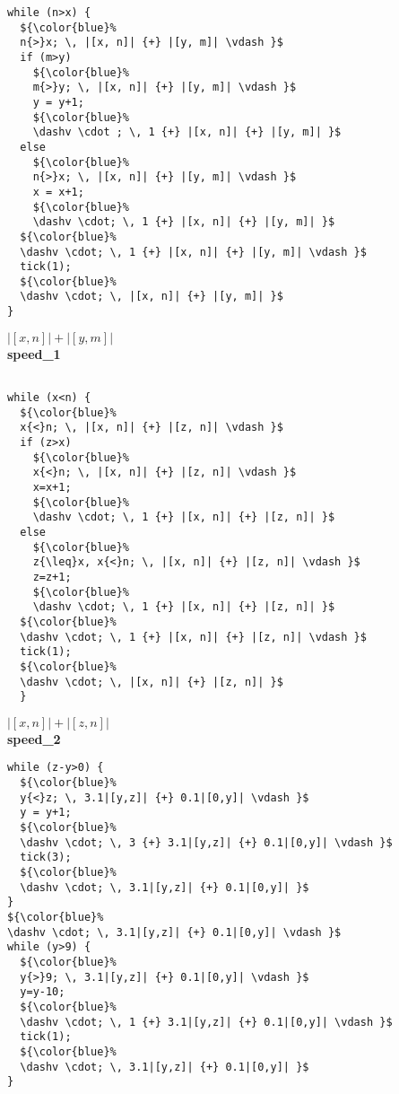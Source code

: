 \documentclass[nocopyrightspace,preprint]{sigplanconf}
\begin{document}
\begin{figure*}[t!]
 \setlength{\progwidth}{.22\linewidth}
  \centering
\hspace{-0.4cm}
  \begin{minipage}[b]{.18\linewidth}
    \begin{center}
   \begin{lstlisting}[]
while (n>x) {
  ${\color{blue}%
  n{>}x; \, |[x, n]| {+} |[y, m]| \vdash }$
  if (m>y) 
    ${\color{blue}%
    m{>}y; \, |[x, n]| {+} |[y, m]| \vdash }$
    y = y+1;
    ${\color{blue}%
    \dashv \cdot ; \, 1 {+} |[x, n]| {+} |[y, m]| }$
  else
    ${\color{blue}%
    n{>}x; \, |[x, n]| {+} |[y, m]| \vdash }$
    x = x+1;
    ${\color{blue}%
    \dashv \cdot; \, 1 {+} |[x, n]| {+} |[y, m]| }$
  ${\color{blue}%
  \dashv \cdot; \, 1 {+} |[x, n]| {+} |[y, m]| \vdash }$
  tick(1);
  ${\color{blue}%
  \dashv \cdot; \, |[x, n]| {+} |[y, m]| }$
}
   \end{lstlisting}

$|[x, n]| + |[y, m]|$
\\[.7\baselineskip]
      {\bf speed\_1}
    \end{center}
  \end{minipage}
%
\hfill
%
  \begin{minipage}[b]{\progwidth}
    \begin{center}
   \begin{lstlisting}

while (x<n) {
  ${\color{blue}%
  x{<}n; \, |[x, n]| {+} |[z, n]| \vdash }$
  if (z>x)
    ${\color{blue}%
    x{<}n; \, |[x, n]| {+} |[z, n]| \vdash }$
    x=x+1;
    ${\color{blue}%
    \dashv \cdot; \, 1 {+} |[x, n]| {+} |[z, n]| }$
  else
    ${\color{blue}%
    z{\leq}x, x{<}n; \, |[x, n]| {+} |[z, n]| \vdash }$
    z=z+1;
    ${\color{blue}%
    \dashv \cdot; \, 1 {+} |[x, n]| {+} |[z, n]| }$
  ${\color{blue}%
  \dashv \cdot; \, 1 {+} |[x, n]| {+} |[z, n]| \vdash }$
  tick(1);
  ${\color{blue}%
  \dashv \cdot; \, |[x, n]| {+} |[z, n]| }$
  }
   \end{lstlisting}

$|[x, n]| + |[z, n]|$
\\[.7\baselineskip]
      {\bf speed\_2}
    \end{center}
  \end{minipage}
%
\hfill
%
  \begin{minipage}[b]{\progwidth}
    \begin{center}
   \begin{lstlisting}
while (z-y>0) {
  ${\color{blue}%
  y{<}z; \, 3.1|[y,z]| {+} 0.1|[0,y]| \vdash }$
  y = y+1;
  ${\color{blue}%
  \dashv \cdot; \, 3 {+} 3.1|[y,z]| {+} 0.1|[0,y]| \vdash }$
  tick(3);
  ${\color{blue}%
  \dashv \cdot; \, 3.1|[y,z]| {+} 0.1|[0,y]| }$
}
${\color{blue}%
\dashv \cdot; \, 3.1|[y,z]| {+} 0.1|[0,y]| \vdash }$
while (y>9) {
  ${\color{blue}%
  y{>}9; \, 3.1|[y,z]| {+} 0.1|[0,y]| \vdash }$
  y=y-10;
  ${\color{blue}%
  \dashv \cdot; \, 1 {+} 3.1|[y,z]| {+} 0.1|[0,y]| \vdash }$
  tick(1);
  ${\color{blue}%
  \dashv \cdot; \, 3.1|[y,z]| {+} 0.1|[0,y]| }$
}
   \end{lstlisting}


\end{center}
\end{minipage}
\end{figure*}
\end{document}
